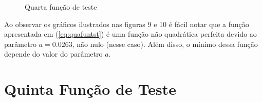 \begin{figure}[h!]
    \centering 
    \qquad
    \qquad
    \caption{Quarta função de teste}%
    \label{fig:quafun}%
\end{figure}
\FloatBarrier

Ao observar os gráficos ilustrados nas figuras 9 e 10 é fácil notar que a função apresentada em (\ref{eq:quafuntst}) é uma função não quadrática perfeita devido ao parâmetro $a = 0.0263$, não nulo (nesse caso). Além disso, o mínimo dessa função depende do valor do parâmetro $a$.

\section{Quinta Função de Teste}\label{sec:quifun}

